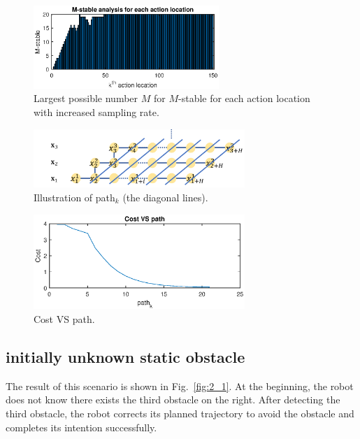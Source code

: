\begin{figure}[t]
\begin{center}
\includegraphics[width=7cm]{plot/1_4.eps}
\caption{Largest possible number $M$ for $M$-stable for each action location with increased sampling rate.}
\label{fig:1_4}
\end{center}
\end{figure}



\begin{figure}[t]
\begin{center}
\includegraphics[width=8cm]{src/1_3_path.png}
\caption{Illustration of path$_k$ (the diagonal lines).}
\label{fig:cost1}
\end{center}
\end{figure}

\begin{figure}[t]
\begin{center}
\includegraphics[width=8cm]{plot/1_3.eps}
\caption{Cost VS path.}
\label{fig:costplot}
\end{center}
\end{figure}

\subsection{initially unknown static obstacle}

The result of this scenario is shown in Fig.~\ref{fig:2_1}. At the beginning, the robot does not know there exists the third obstacle on the right. After detecting the third obstacle, the robot corrects its planned trajectory to avoid the obstacle and completes its intention successfully.

